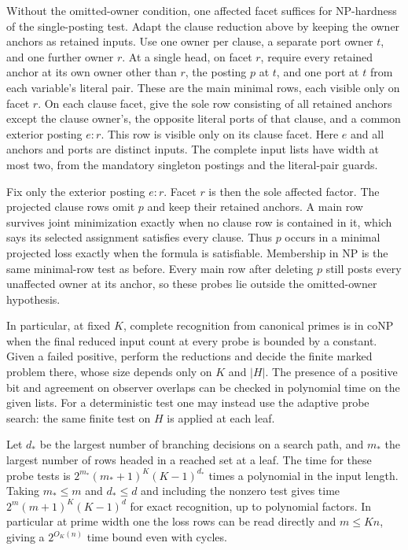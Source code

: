 Without the omitted-owner condition, one affected
facet suffices for NP-hardness of the single-posting
test. Adapt the clause reduction above by keeping
the owner anchors as retained inputs. Use one
owner per clause, a separate port owner $t$,
and one further owner $r$. At a single head,
on facet $r$, require every retained anchor
at its own owner other than $r$, the posting
$p$ at $t$, and one port at $t$ from each
variable's literal pair. These are the main
minimal rows, each visible only on facet $r$.
On each clause facet, give the sole row
consisting of all retained anchors except
the clause owner's, the opposite literal
ports of that clause, and a common exterior
posting $e:r$. This row is visible only
on its clause facet. Here $e$ and all
anchors and ports are distinct inputs.
The complete input lists have width at
most two, from the mandatory singleton
postings and the literal-pair guards.

Fix only the exterior posting $e:r$.
Facet $r$ is then the sole affected
factor. The projected clause rows
omit $p$ and keep their retained anchors.
A main row survives joint minimization
exactly when no clause row is contained
in it, which says its selected assignment
satisfies every clause. Thus $p$ occurs
in a minimal projected loss exactly
when the formula is satisfiable.
Membership in NP is the same minimal-row
test as before. Every main row after
deleting $p$ still posts every unaffected
owner at its anchor, so these probes
lie outside the omitted-owner hypothesis.

In particular, at fixed $K$, complete recognition from
canonical primes is in coNP when the final reduced
input count at every probe is bounded by a constant.
Given a failed positive, perform the reductions and decide the
finite marked problem there, whose size depends only
on $K$ and $|H|$. The presence of a positive bit
and agreement on observer overlaps can be checked
in polynomial time on the given lists. For a deterministic
test one may instead use the adaptive probe search:
the same finite test on $H$ is applied at each leaf.

Let $d_*$ be the largest number of branching decisions on
a search path, and $m_*$ the largest number of rows headed
in a reached set at a leaf. The time for these probe tests is
$2^{m_*}(m_*+1)^K(K-1)^{d_*}$ times a polynomial in the
input length. Taking $m_*\le m$ and $d_*\le d$ and including
the nonzero test gives time $2^m(m+1)^K(K-1)^d$ for exact
recognition, up to polynomial factors. In particular at prime width one the
loss rows can be read directly and $m\le Kn$, giving
a $2^{O_K(n)}$ time bound even with cycles.

